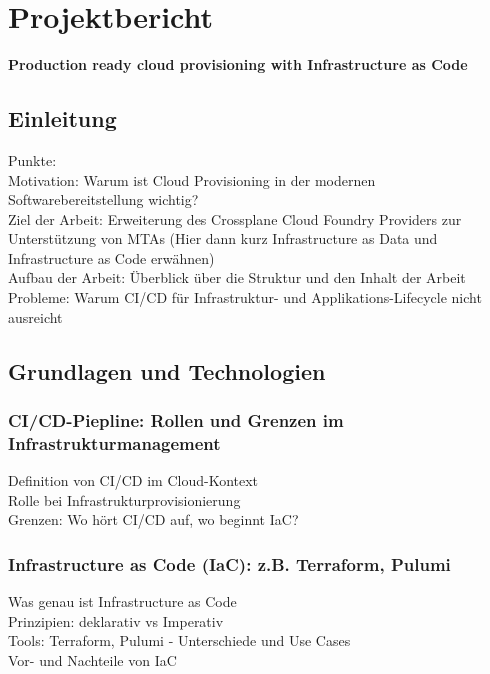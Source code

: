 %
%

\section{Projektbericht}

\begin{center}
    \large
    \textbf{Production ready cloud provisioning with Infrastructure as Code}
\end{center}

\subsection{Einleitung}
Punkte: \\
Motivation: Warum ist Cloud Provisioning in der modernen Softwarebereitstellung wichtig? \\
Ziel der Arbeit: Erweiterung des Crossplane Cloud Foundry Providers zur Unterstützung von MTAs
(Hier dann kurz Infrastructure as Data und Infrastructure as Code erwähnen) \\
Aufbau der Arbeit: Überblick über die Struktur und den Inhalt der Arbeit \\
Probleme: Warum CI/CD für Infrastruktur- und Applikations-Lifecycle nicht ausreicht\cite{lustigeCitation}

\subsection{Grundlagen und Technologien}

\subsubsection{CI/CD-Piepline: Rollen und Grenzen im Infrastrukturmanagement}
Definition von CI/CD im Cloud-Kontext \\
Rolle bei Infrastrukturprovisionierung \\
Grenzen: Wo hört CI/CD auf, wo beginnt IaC?

\subsubsection{Infrastructure as Code (IaC): z.B. Terraform, Pulumi}
Was genau ist Infrastructure as Code \\
Prinzipien: deklarativ vs Imperativ \\
Tools: Terraform, Pulumi - Unterschiede und Use Cases \\
Vor- und Nachteile von IaC

